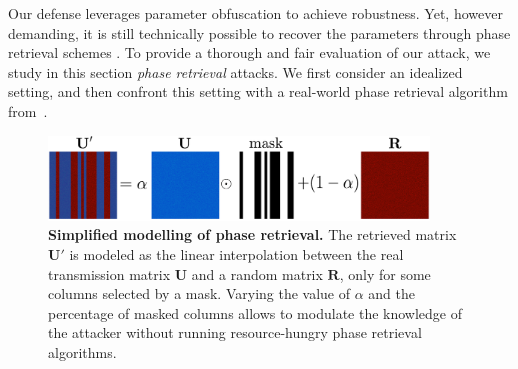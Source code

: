 \documentclass{article}
\begin{document}
Our defense leverages parameter obfuscation to achieve robustness. Yet, however demanding, it is still technically possible to recover the parameters through phase retrieval schemes \cite{Gupta2019DontTI,Gupta2020FastOS}. To provide a thorough and fair evaluation of our attack, we study in this section \emph{phase retrieval} attacks. We first consider an idealized setting, and then confront this setting with a real-world phase retrieval algorithm from~\cite{Gupta2020FastOS}.
\begin{figure}
    \centering
    \includegraphics[width=0.9\textwidth]{retrieval-model.pdf}
    \caption{\textbf{Simplified modelling of phase retrieval.} The retrieved matrix $\mathbf{U'}$ is modeled as the linear interpolation between the real transmission matrix $\mathbf{U}$ and a random matrix $\mathbf{R}$, only for some columns selected by a mask. Varying the value of $\alpha$ and the percentage of masked columns allows to modulate the knowledge of the attacker without running resource-hungry phase retrieval algorithms.}
    \label{fig:retrieval-model}
\end{figure}
\end{document}
